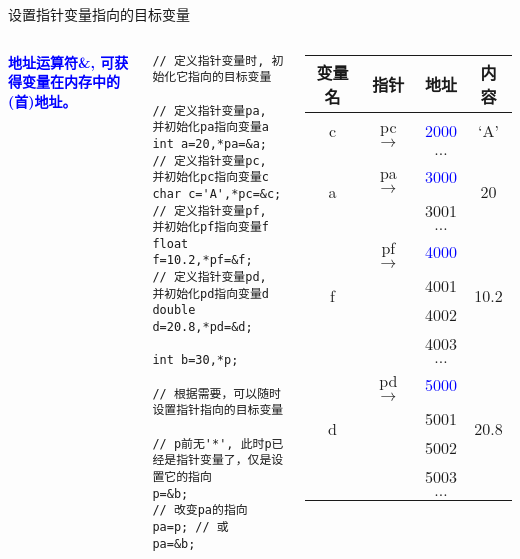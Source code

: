 \begin{frame}{设置指针变量指向的目标变量}
\vspace{-0.2cm}
\begin{columns}[T]
\textbf{\textcolor{blue}{地址运算符\&, 可获得变量在内存中的(首)地址。}}
\begin{lstlisting}
// 定义指针变量时, 初始化它指向的目标变量

// 定义指针变量pa, 并初始化pa指向变量a
int a=20,*pa=&a; 
// 定义指针变量pc, 并初始化pc指向变量c
char c='A',*pc=&c; 
// 定义指针变量pf, 并初始化pf指向变量f
float f=10.2,*pf=&f; 
// 定义指针变量pd, 并初始化pd指向变量d
double d=20.8,*pd=&d;

int b=30,*p; 

// 根据需要，可以随时设置指针指向的目标变量

// p前无'*', 此时p已经是指针变量了，仅是设置它的指向
p=&b; 
// 改变pa的指向
pa=p; // 或
pa=&b;
\end{lstlisting}
\small
\begin{tabular}{|c|c|c|c|}
	\hline 
	\textbf{变量名} & \textbf{指针} &\textbf{地址} & \textbf{内容} \\ 
	\hline 
	c & pc $\to$& \textcolor{blue}{2000} & `A' \\ 
	\hline 
	& & $\dots$ &  \\ 
	\hline 
	\multirow{2}{*}{a} &  pa $\to$ & \textcolor{blue}{3000} & \multirow{2}{*}{20} \\ \cline{3-3} 
	& & 3001 &  \\ 
	\hline 
	& & $\dots$ &  \\ 
	\hline 
	\multirow{4}{*}{f} &  pf $\to$ & \textcolor{blue}{4000} & \multirow{4}{*}{10.2}  \\ \cline{3-3} 
	& & 4001 &  \\ \cline{3-3}
	& & 4002 &  \\ \cline{3-3}
	& &4003 &  \\ 
	\hline 
	& & $\dots$ &  \\ 
	\hline 
	\multirow{4}{*}{d} &  pd $\to$ & \textcolor{blue}{5000} & \multirow{4}{*}{20.8} \\ \cline{3-3}
	& & 5001 &  \\ \cline{3-3}
	& & 5002 &  \\ \cline{3-3}
	& & 5003 &  \\ \cline{3-3}
	& & $\dots$ &  \\ 
	\hline 
\end{tabular} 
\end{columns}
\medskip
\end{frame}

